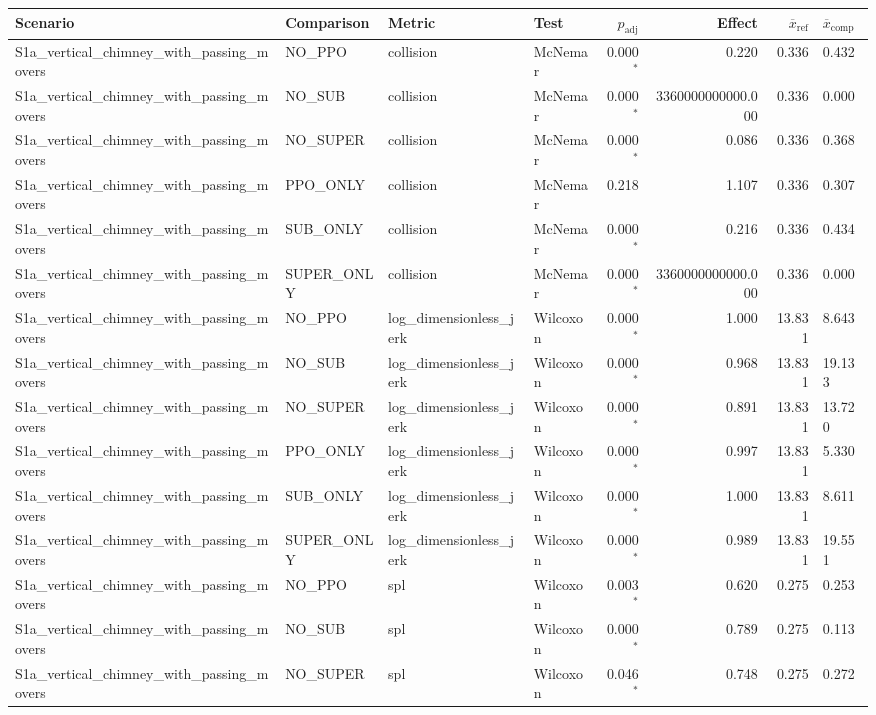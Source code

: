 \begin{tabular}{llllrrrl}
\toprule
Scenario & Comparison & Metric & Test & $p_\mathrm{adj}$ & Effect & $\overline{x}_\mathrm{ref}$ & $\overline{x}_\mathrm{comp}$ \\
\midrule
  S1a_vertical_chimney_with_passing_movers & NO_PPO & collision & McNemar & 0.000$^{*}$ & 0.220 & 0.336 & 0.432 \\
  S1a_vertical_chimney_with_passing_movers & NO_SUB & collision & McNemar & 0.000$^{*}$ & 3360000000000.000 & 0.336 & 0.000 \\
  S1a_vertical_chimney_with_passing_movers & NO_SUPER & collision & McNemar & 0.000$^{*}$ & 0.086 & 0.336 & 0.368 \\
  S1a_vertical_chimney_with_passing_movers & PPO_ONLY & collision & McNemar & 0.218 & 1.107 & 0.336 & 0.307 \\
  S1a_vertical_chimney_with_passing_movers & SUB_ONLY & collision & McNemar & 0.000$^{*}$ & 0.216 & 0.336 & 0.434 \\
  S1a_vertical_chimney_with_passing_movers & SUPER_ONLY & collision & McNemar & 0.000$^{*}$ & 3360000000000.000 & 0.336 & 0.000 \\
  S1a_vertical_chimney_with_passing_movers & NO_PPO & log_dimensionless_jerk & Wilcoxon & 0.000$^{*}$ & 1.000 & 13.831 & 8.643 \\
  S1a_vertical_chimney_with_passing_movers & NO_SUB & log_dimensionless_jerk & Wilcoxon & 0.000$^{*}$ & 0.968 & 13.831 & 19.133 \\
  S1a_vertical_chimney_with_passing_movers & NO_SUPER & log_dimensionless_jerk & Wilcoxon & 0.000$^{*}$ & 0.891 & 13.831 & 13.720 \\
  S1a_vertical_chimney_with_passing_movers & PPO_ONLY & log_dimensionless_jerk & Wilcoxon & 0.000$^{*}$ & 0.997 & 13.831 & 5.330 \\
  S1a_vertical_chimney_with_passing_movers & SUB_ONLY & log_dimensionless_jerk & Wilcoxon & 0.000$^{*}$ & 1.000 & 13.831 & 8.611 \\
  S1a_vertical_chimney_with_passing_movers & SUPER_ONLY & log_dimensionless_jerk & Wilcoxon & 0.000$^{*}$ & 0.989 & 13.831 & 19.551 \\
  S1a_vertical_chimney_with_passing_movers & NO_PPO & spl & Wilcoxon & 0.003$^{*}$ & 0.620 & 0.275 & 0.253 \\
  S1a_vertical_chimney_with_passing_movers & NO_SUB & spl & Wilcoxon & 0.000$^{*}$ & 0.789 & 0.275 & 0.113 \\
  S1a_vertical_chimney_with_passing_movers & NO_SUPER & spl & Wilcoxon & 0.046$^{*}$ & 0.748 & 0.275 & 0.272 \\

\end{tabular}
